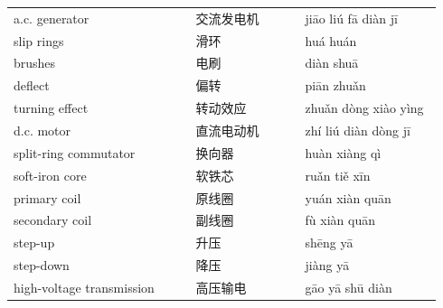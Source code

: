 \documentclass[11pt]{article}
\begin{document}
\begin{longtable}{@{}p{0.40\linewidth}p{0.24\linewidth}p{0.30\linewidth}@{}}
a.c. generator & 交流发电机 & jiāo liú fā diàn jī \\
slip rings & 滑环 & huá huán \\
brushes & 电刷 & diàn shuā \\
deflect & 偏转 & piān zhuǎn \\
turning effect & 转动效应 & zhuǎn dòng xiào yìng \\
d.c. motor & 直流电动机 & zhí liú diàn dòng jī \\
split-ring commutator & 换向器 & huàn xiàng qì \\
soft-iron core & 软铁芯 & ruǎn tiě xīn \\
primary coil & 原线圈 & yuán xiàn quān \\
secondary coil & 副线圈 & fù xiàn quān \\
step-up & 升压 & shēng yā \\
step-down & 降压 & jiàng yā \\
high-voltage transmission & 高压输电 & gāo yā shū diàn \\
\end{longtable}
\end{document}
